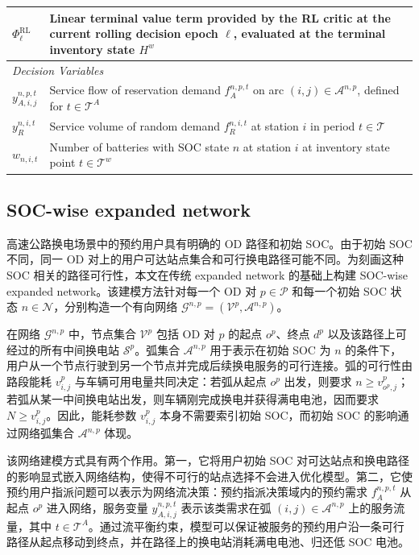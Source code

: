 \documentclass[12pt,hyperref,a4paper,UTF8]{ctexart}
\begin{document}
\begin{table}[!htbp]
\begin{tabular}{@{}lp{13cm}@{}}
    $\Phi^{\mathrm{RL}}_{\ell}$ & Linear terminal value term provided by the RL critic at the current rolling decision epoch $\ell$, evaluated at the terminal inventory state $H^w$ \\
    \midrule
    \multicolumn{2}{l}{\textit{Decision Variables}} \\
    $y_{A,i,j}^{n,p,t}$ & Service flow of reservation demand $f_{A}^{n,p,t}$ on arc $(i,j)\in\mathcal{A}^{n,p}$, defined for $t\in\mathcal{T}^{A}$ \\
    $y_{R}^{n,i,t}$ & Service volume of random demand $f_{R}^{n,i,t}$ at station $i$ in period $t\in\mathcal{T}$ \\
    $w_{n,i,t}$ & Number of batteries with SOC state $n$ at station $i$ at inventory state point $t\in\mathcal{T}^{w}$ \\
    \bottomrule
  \end{tabular}
\end{table}

\subsection{SOC-wise expanded network}

高速公路换电场景中的预约用户具有明确的 OD 路径和初始 SOC。由于初始 SOC 不同，同一 OD 对上的用户可达站点集合和可行换电路径可能不同。为刻画这种 SOC 相关的路径可行性，本文在传统 expanded network 的基础上构建 SOC-wise expanded network。该建模方法针对每一个 OD 对 $p\in\mathcal{P}$ 和每一个初始 SOC 状态 $n\in\mathcal{N}$，分别构造一个有向网络 $\mathcal{G}^{n,p}=(\mathcal{V}^{p},\mathcal{A}^{n,p})$。

在网络 $\mathcal{G}^{n,p}$ 中，节点集合 $\mathcal{V}^{p}$ 包括 OD 对 $p$ 的起点 $o^p$、终点 $d^p$ 以及该路径上可经过的所有中间换电站 $\mathcal{S}^{p}$。弧集合 $\mathcal{A}^{n,p}$ 用于表示在初始 SOC 为 $n$ 的条件下，用户从一个节点行驶到另一个节点并完成后续换电服务的可行连接。弧的可行性由路段能耗 $v^p_{i,j}$ 与车辆可用电量共同决定：若弧从起点 $o^p$ 出发，则要求 $n\ge v^p_{o^p,j}$；若弧从某一中间换电站出发，则车辆刚完成换电并获得满电电池，因而要求 $N\ge v^p_{i,j}$。因此，能耗参数 $v^p_{i,j}$ 本身不需要索引初始 SOC，而初始 SOC 的影响通过网络弧集合 $\mathcal{A}^{n,p}$ 体现。

该网络建模方式具有两个作用。第一，它将用户初始 SOC 对可达站点和换电路径的影响显式嵌入网络结构，使得不可行的站点选择不会进入优化模型。第二，它使预约用户指派问题可以表示为网络流决策：预约指派决策域内的预约需求 $f_A^{n,p,t}$ 从起点 $o^p$ 进入网络，服务变量 $y_{A,i,j}^{n,p,t}$ 表示该类需求在弧 $(i,j)\in\mathcal{A}^{n,p}$ 上的服务流量，其中 $t\in\mathcal{T}^{A}$。通过流平衡约束，模型可以保证被服务的预约用户沿一条可行路径从起点移动到终点，并在路径上的换电站消耗满电电池、归还低 SOC 电池。
\end{document}
